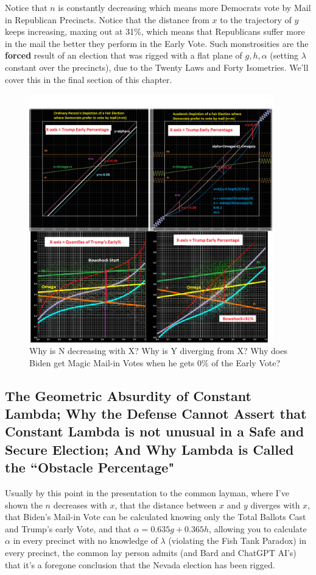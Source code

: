 Notice that $n$ is constantly decreasing which means more Democrats vote by Mail in Republican Precincts. Notice that the distance from $x$ to the trajectory of $y$ keeps increasing, maxing out at 31\%, which means that Republicans suffer more in the mail the better they perform in the Early Vote. Such monstrosities are the \textbf{forced} result of an election that was rigged with a flat plane of $g,h,\alpha$ (setting $\lambda$ constant over the precincts), due to the Twenty Laws and Forty Isometries. We'll cover this in the final section of this chapter.
\begin{figure}[bp!]
\begin{center}
\caption{Why is N decreasing with X? Why is Y diverging from X? Why does Biden get Magic Mail-in Votes when he gets 0\% of the Early Vote?}
\includegraphics[width=300pt]{Clark County vs Common Sense.png}
\end{center}
\end{figure}
\newpage
\subsection{The Geometric Absurdity of Constant Lambda; Why the Defense Cannot Assert that Constant Lambda is not unusual in a Safe and Secure Election; And Why Lambda is Called the ``Obstacle Percentage"}

Usually by this point in the presentation to the common layman, where I've shown the $n$ decreases with $x$, that the distance between $x$ and $y$ diverges with $x$, that Biden's Mail-in Vote can be calculated knowing only the Total Ballots Cast and Trump's early Vote, and that $\alpha=0.635g+0.365h$, allowing you to calculate $\alpha$ in every precinct with no knowledge of $\lambda$ (violating the Fish Tank Paradox) in every precinct, the common lay person admits (and Bard and ChatGPT AI's) that it's a foregone conclusion that the Nevada election has been rigged.

